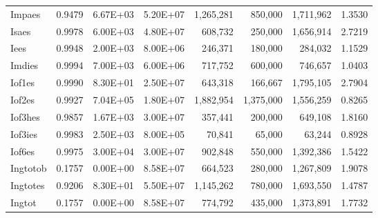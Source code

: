 \begin{longtable}{lrrrrrrr}
Impaes & 0.9479 & 6.67E+03 & 5.20E+07 & 1,265,281 & 850,000 & 1,711,962 & 1.3530 \\
Isaes & 0.9978 & 6.00E+03 & 4.80E+07 & 608,732 & 250,000 & 1,656,914 & 2.7219 \\
Iees & 0.9948 & 2.00E+03 & 8.00E+06 & 246,371 & 180,000 & 284,032 & 1.1529 \\
Imdies & 0.9994 & 7.00E+03 & 6.00E+06 & 717,752 & 600,000 & 746,657 & 1.0403 \\
Iof1es & 0.9990 & 8.30E+01 & 2.50E+07 & 643,318 & 166,667 & 1,795,105 & 2.7904 \\
Iof2es & 0.9927 & 7.04E+05 & 1.80E+07 & 1,882,954 & 1,375,000 & 1,556,259 & 0.8265 \\
Iof3hes & 0.9857 & 1.67E+03 & 3.00E+07 & 357,441 & 200,000 & 649,108 & 1.8160 \\
Iof3ies & 0.9983 & 2.50E+03 & 8.00E+05 & 70,841 & 65,000 & 63,244 & 0.8928 \\
Iof6es & 0.9975 & 3.00E+04 & 3.00E+07 & 902,848 & 550,000 & 1,392,386 & 1.5422 \\
Ingtotob & 0.1757 & 0.00E+00 & 8.58E+07 & 664,523 & 280,000 & 1,267,809 & 1.9078 \\
Ingtotes & 0.9206 & 8.30E+01 & 5.50E+07 & 1,145,262 & 780,000 & 1,693,550 & 1.4787 \\
Ingtot & 0.1757 & 0.00E+00 & 8.58E+07 & 774,792 & 435,000 & 1,373,891 & 1.7732 \\
\end{longtable}